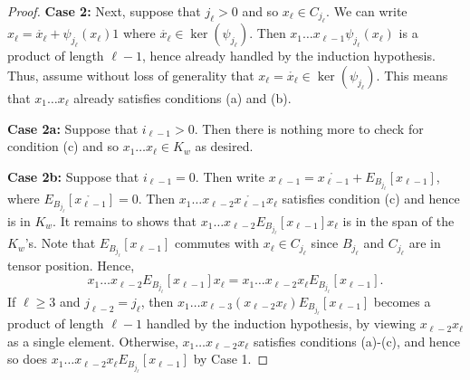 \documentclass[10pt]{amsart}
\numberwithin{equation}{section}
\theoremstyle{definition}
\begin{document}
\begin{proof}
	\textbf{Case 2:} Next, suppose that $j_\ell > 0$ and so $x_\ell \in C_{j_\ell}$.  We can write $x_\ell = \mathring{x_\ell} + \psi_{j_\ell}(x_\ell) 1$ where $\mathring{x_\ell} \in \ker(\psi_{j_\ell})$.  Then $x_1 \dots x_{\ell-1} \psi_{j_\ell}(x_\ell) $ is a product of length $\ell - 1$, hence already handled by the induction hypothesis.  Thus, assume without loss of generality that $x_\ell = \mathring{x_\ell} \in \ker(\psi_{j_\ell})$.  This means that $x_1 \dots x_\ell$ already satisfies conditions (a) and (b).  
	
	\textbf{Case 2a:} Suppose that $i_{\ell-1} > 0$.   Then there is nothing more to check for condition (c) and so $x_1 \dots x_\ell \in K_w$ as desired.
	
	\textbf{Case 2b:} Suppose that $i_{\ell-1} = 0$.  Then write $x_{\ell-1} = \mathring{x_{\ell-1}} + E_{B_{j_\ell}}[x_{\ell-1}]$, where $E_{B_{j_\ell}}[\mathring{x_{\ell-1}}] = 0$.  Then $x_1 \dots x_{\ell-2} \mathring{x_{\ell-1}} x_\ell$ satisfies condition (c) and hence is in $K_w$.  It remains to shows that $x_1 \dots x_{\ell-2} E_{B_{j_\ell}}[x_{\ell-1}] x_\ell$ is in the span of the $K_w$'s.  Note that $E_{B_{j_\ell}}[x_{\ell-1}]$ commutes with $x_\ell \in C_{j_\ell}$ since $B_{j_\ell}$ and $C_{j_\ell}$ are in tensor position. Hence,
	\[
	x_1 \dots x_{\ell-2} E_{B_{j_\ell}}[x_{\ell-1}] x_\ell = x_1 \dots x_{\ell-2} x_\ell E_{B_{j_\ell}}[x_{\ell-1}].
	\]
	If $\ell \geq 3$ and $j_{\ell-2} = j_\ell$, then $x_1 \dots x_{\ell-3}(x_{\ell-2} x_\ell) E_{B_{j_\ell}}[x_{\ell-1}]$ becomes a product of length $\ell - 1$ handled by the induction hypothesis, by viewing $x_{\ell-2} x_\ell$ as a single element. Otherwise, $x_1 \dots x_{\ell-2} x_\ell$ satisfies conditions (a)-(c), and hence so does $x_1 \dots x_{\ell-2} x_\ell E_{B_{j_\ell}}[x_{\ell-1}]$ by Case 1.
\end{proof}
\end{document}
